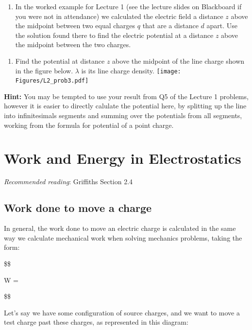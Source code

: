 \documentclass[
  letterpaper,
  DIV=11,
  numbers=noendperiod]{scrreprt}
\providecommand{\tightlist}{%
  \setlength{\itemsep}{0pt}\setlength{\parskip}{0pt}}\usepackage{longtable,booktabs,array}
\begin{document}
\begin{enumerate}
\def\labelenumi{\arabic{enumi})}
\setcounter{enumi}{1}
\tightlist
\item
  In the worked example for Lecture 1 (see the lecture slides on
  Blackboard if you were not in attendance) we calculated the electric
  field a distance \(z\) above the midpoint between two equal charges
  \(q\) that are a distance \(d\) apart. Use the solution found there to
  find the electric potential at a distance \(z\) above the midpoint
  between the two charges.
\end{enumerate}

\begin{enumerate}
\def\labelenumi{\arabic{enumi})}
\setcounter{enumi}{2}
\tightlist
\item
  Find the potential at distance \(z\) above the midpoint of the line
  charge shown in the figure below. \(\lambda\) is its line charge
  density.
  \texttt{[image: Figures/L2\_prob3.pdf]}
\end{enumerate}

\textbf{Hint:} You may be tempted to use your result from Q5 of the
Lecture 1 problems, however it is easier to directly calulate the
potential here, by splitting up the line into infinitesimals segments
and summing over the potentials from all segments, working from the
formula for potential of a point charge.


\chapter{Work and Energy in
Electrostatics}\label{work-and-energy-in-electrostatics}

\emph{Recommended reading}: Griffiths Section 2.4

\section{Work done to move a charge}\label{work-done-to-move-a-charge}

In general, the work done to move an electric charge is calculated in
the same way we calculate mechanical work when solving mechanics
problems, taking the form:

\$\$

W = \int {} \cdot {}  

\$\$

Let's say we have some configuration of source charges, and we want to
move a test charge past these charges, as represented in this diagram:
\end{document}
